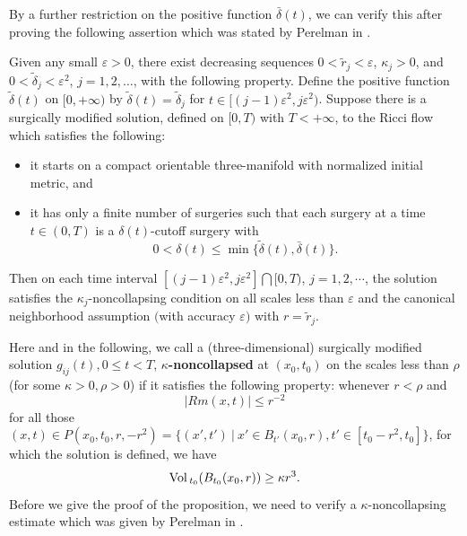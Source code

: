 By a further restriction on the positive function
$\bar{\delta}(t)$, we can verify this after proving the following
assertion which was stated by Perelman in \cite{P2}.

\begin{proposition}
  \label{prop:cz-canonical-neighborhood-induction-surgery}
 Given any small $\varepsilon>0$, there exist
decreasing sequences $0<\widetilde{r}_j<\varepsilon$,
$\kappa_j>0$, and $0<\widetilde{\delta}_j<\varepsilon^2 $,
$j=1,2,\ldots$, with the following property. Define the positive
function $\widetilde{\delta}(t)$ on $[0,+\infty)$ by
$\widetilde{\delta}(t) = \widetilde{\delta}_j$ for $t \in
[(j-1)\varepsilon^2,j\varepsilon^2)$. Suppose there is a
surgically modified solution, defined on $[0,T)$ with $T
<+\infty$, to the Ricci flow which satisfies the following:
\begin{itemize}
\item[(1)] it starts on a compact orientable three-manifold with
normalized initial metric, and \item[(2)] it has only a finite
number of surgeries such that each surgery at a time $t \in (0,T)$
is a $\delta(t)$-cutoff surgery with
$$
0 < \delta(t) \leq \min \{\widetilde{\delta}(t),\bar{\delta}(t)\}.
$$
\end{itemize}
Then on each time interval
$[(j-1)\varepsilon^2,j\varepsilon^2]\bigcap [0,T)$, $ j = 1, 2,
\cdots $, the solution satisfies the $\kappa_j$-noncollapsing
condition on all scales less than $\varepsilon$ and the canonical
neighborhood assumption $($with accuracy $\varepsilon)$ with
$r=\widetilde{r}_j$.
\end{proposition}

Here and in the following, we call a (three-dimensional)
surgically modified solution $g_{ij}(t), 0 \leq t <T$,
\textbf{$\kappa$-noncollapsed}  at
$(x_0,t_0)$ on the scales less than $\rho$ (for some
$\kappa>0,\rho>0$) if it satisfies the following property:
whenever $r < \rho$ and
$$
|Rm(x,t)| \leq r^{-2}
$$
for all those $(x,t) \in P(x_0,t_0,r,-r^2)=\{ (x',t') \ |\ x'\in
B_{t'}(x_0,r), t' \in [t_0 -r^2,t_0] \}$, for which the solution
is defined, we have
$$
{\rm Vol}\,_{t_0}(B_{t_0}(x_0,r)) \geq \kappa r^3.
$$
Before we give the proof of the proposition, we need to verify a
$\kappa$-non\-collapsing estimate which was given by Perelman in
\cite{P2}.


